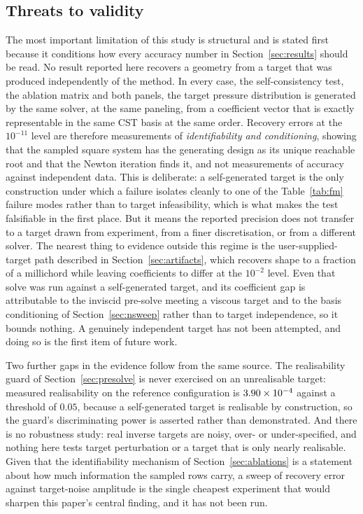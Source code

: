 \subsection{Threats to validity}
\label{sec:validity}

The most important limitation of this study is structural and is stated first
because it conditions how every accuracy number in
Section~\ref{sec:results} should be read. No result reported here recovers a
geometry from a target that was produced independently of the method. In every
case, the self-consistency test, the ablation matrix and both panels, the
target pressure distribution is generated by the same solver, at the same
paneling, from a coefficient vector that is exactly representable in the same
CST basis at the same order. Recovery errors at the $10^{-11}$ level are
therefore measurements of \emph{identifiability and conditioning}, showing
that the sampled square system has the generating design as its unique
reachable root and that the Newton iteration finds it, and not measurements of
accuracy against independent data. This is deliberate: a self-generated target
is the only construction under which a failure isolates cleanly to one of the
Table~\ref{tab:fm} failure modes rather than to target infeasibility, which is
what makes the test falsifiable in the first place. But it means the reported
precision does not transfer to a target drawn from experiment, from a finer
discretisation, or from a different solver. The nearest thing to evidence outside this regime is the
user-supplied-target path described in Section~\ref{sec:artifacts}, which
recovers shape to a fraction of a millichord while leaving coefficients to
differ at the $10^{-2}$ level. Even that solve was run against a
self-generated target, and its coefficient gap is attributable to the
inviscid pre-solve meeting a viscous target and to the basis conditioning of
Section~\ref{sec:nsweep} rather than to target independence, so it bounds
nothing. A genuinely independent target has not been attempted, and doing so
is the first item of future work.

Two further gaps in the evidence follow from the same source. The
realisability guard of Section~\ref{sec:presolve} is never exercised on an
unrealisable target: measured realisability on the reference configuration is
$3.90\times10^{-4}$ against a threshold of $0.05$, because a self-generated target
is realisable by construction, so the guard's discriminating power is asserted
rather than demonstrated. And there is no robustness study: real inverse
targets are noisy, over- or under-specified, and nothing here tests target
perturbation or a target that is only nearly realisable. Given that the
identifiability mechanism of Section~\ref{sec:ablations} is a statement about
how much information the sampled rows carry, a sweep of recovery error against
target-noise amplitude is the single cheapest experiment that would sharpen
this paper's central finding, and it has not been run.

